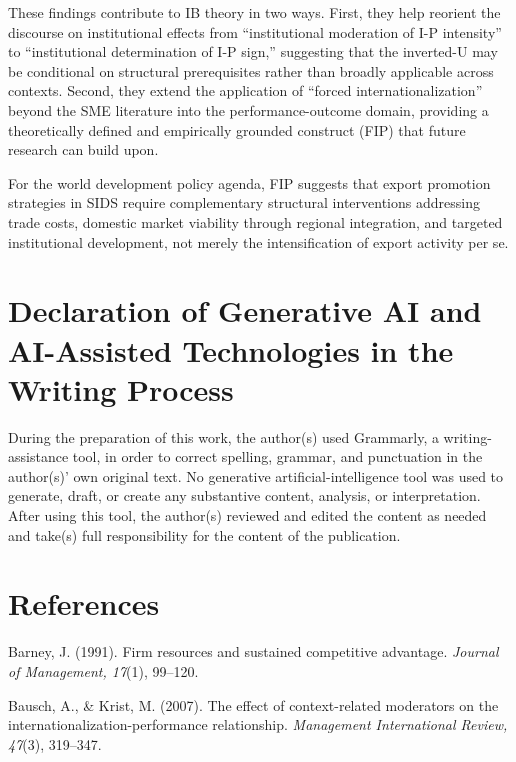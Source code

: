 \documentclass[
  12pt]{article}
\begin{document}
These findings contribute to IB theory in two ways. First, they help
reorient the discourse on institutional effects from ``institutional
moderation of I-P intensity'' to ``institutional determination of I-P
sign,'' suggesting that the inverted-U may be conditional on structural
prerequisites rather than broadly applicable across contexts. Second,
they extend the application of ``forced internationalization'' beyond
the SME literature into the performance-outcome domain, providing a
theoretically defined and empirically grounded construct (FIP) that
future research can build upon.

For the world development policy agenda, FIP suggests that export
promotion strategies in SIDS require complementary structural
interventions addressing trade costs, domestic market viability through
regional integration, and targeted institutional development, not merely
the intensification of export activity per se.

\hypertarget{declaration-of-generative-ai-and-ai-assisted-technologies-in-the-writing-process}{%
\section{Declaration of Generative AI and AI-Assisted Technologies in
the Writing
Process}\label{declaration-of-generative-ai-and-ai-assisted-technologies-in-the-writing-process}}

During the preparation of this work, the author(s) used Grammarly, a
writing-assistance tool, in order to correct spelling, grammar, and
punctuation in the author(s)' own original text. No generative
artificial-intelligence tool was used to generate, draft, or create any
substantive content, analysis, or interpretation. After using this tool,
the author(s) reviewed and edited the content as needed and take(s) full
responsibility for the content of the publication.

\hypertarget{references}{%
\section{References}\label{references}}

Barney, J. (1991). Firm resources and sustained competitive advantage.
\emph{Journal of Management, 17}(1), 99--120.

Bausch, A., \& Krist, M. (2007). The effect of context-related
moderators on the internationalization-performance relationship.
\emph{Management International Review, 47}(3), 319--347.
\end{document}
